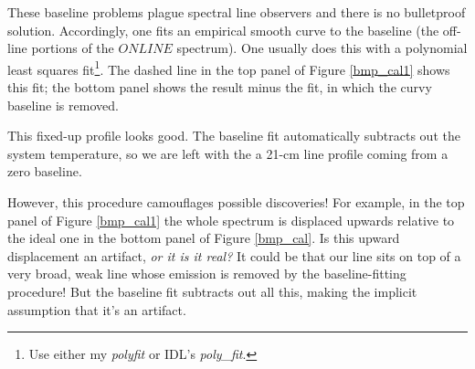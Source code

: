 \documentclass[preprint]{aastex}
\begin{document}
	These baseline problems plague spectral line observers and there
is no bulletproof solution. Accordingly, one fits an empirical smooth
curve to the baseline (the off-line portions of the $ONLINE$ spectrum).
One usually does this with a polynomial least squares fit\footnote{Use
either my {\it polyfit} or IDL's {\it poly\_fit}.}. The
dashed line in the top panel of Figure \ref{bmp_cal1} shows this fit;
the bottom panel shows the result minus the fit, in which the curvy
baseline is removed. 

	This fixed-up profile looks good. The baseline fit automatically
subtracts out the system temperature, so we are left with the a 21-cm
line profile coming from a zero baseline. 

	However, this procedure camouflages possible discoveries! For
example, in the top panel of Figure \ref{bmp_cal1} the whole spectrum is
displaced upwards relative to the ideal one in the bottom panel of
Figure \ref{bmp_cal}. Is this upward displacement an artifact, {\it or
it is it real?} It could be that our line sits on top of a very broad,
weak line whose emission is removed by the baseline-fitting procedure!
But the baseline fit subtracts out all this, making the implicit
assumption that it's an artifact.
\end{document}
